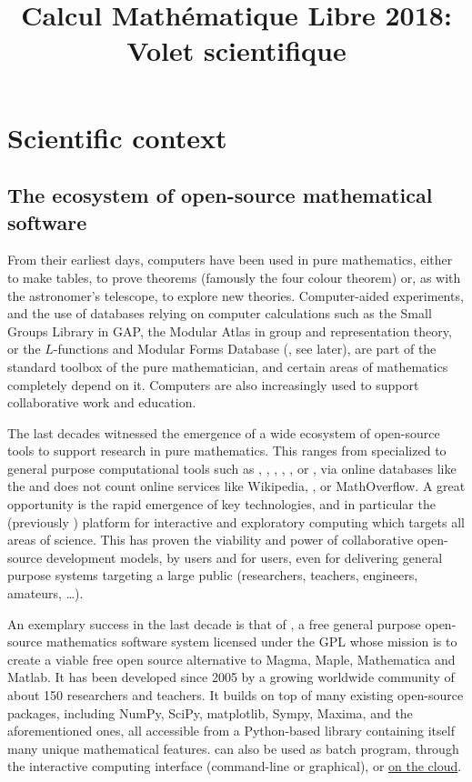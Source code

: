 \documentclass[12pt]{amsart}
\begin{document}
\title{Calcul Mathématique Libre 2018:\\Volet scientifique}
\maketitle
\thispagestyle{empty}
\section{Scientific context}

\subsection{The ecosystem of open-source mathematical software}

From their earliest days, computers have been used in pure
mathematics, either to make tables, to prove theorems (famously the
four colour theorem) or, as with the astronomer's telescope, to
explore new theories. Computer-aided experiments, and the use of
databases relying on computer calculations such as the Small Groups
Library in GAP, the Modular Atlas in group and representation theory,
or the $L$-functions and Modular Forms Database (\LMFDB, see later),
are part of the standard toolbox of the pure mathematician, and
certain areas of mathematics completely depend on it. Computers are
also increasingly used to support collaborative work and education.

The last decades witnessed the emergence of a wide ecosystem of
open-source tools to support research in pure mathematics. This ranges
from specialized to general purpose computational tools such as \GAP,
\PariGP, \Linbox, \MPIR, \Sage, or \Singular, via online databases
like the \LMFDB and does not count online services like Wikipedia,
\Arxiv, or MathOverflow. A great opportunity is the rapid emergence of
key technologies, and in particular the \Jupyter (previously \IPython)
platform for interactive and exploratory computing which targets all
areas of science. This has proven the viability and power of
collaborative open-source development models, by users and for users,
even for delivering general purpose systems targeting a large public
(researchers, teachers, engineers, amateurs, \ldots).

An exemplary success in the last decade is that of \Sage,
a free general purpose open-source mathematics
software system licensed under the GPL whose mission is to create a
viable free open source alternative to Magma, Maple, Mathematica and
Matlab. It has been developed since 2005 by a growing worldwide community of
about 150 researchers and teachers. It builds on top of many existing
open-source packages, including NumPy, SciPy, matplotlib, Sympy,
Maxima, and the aforementioned ones, all accessible from a
Python-based library containing itself many unique mathematical
features. \Sage can also be used as batch program, through the
\Jupyter interactive computing interface (command-line or graphical),
or \href{cloud.sagemath.org}{on the cloud}.
\end{document}
